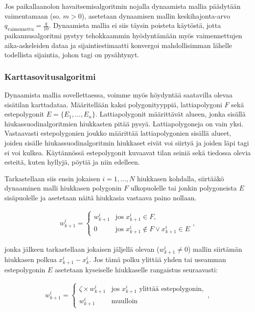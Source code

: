 \documentclass[
  12pt,
  a4paper, twoside]{book}
\begin{document}
Jos paikallaanolon havaitsemisalgoritmin nojalla dynaamista mallia päädytään vaimentamaan (so. \(m>0\)), asetetaan dynaamisen mallin keskihajonta-arvo \(q_{\text{vaimennettu}}=\frac{q}{10}\). Dynaamista mallia ei siis täysin poisteta käytöstä, jotta paikannusalgoritmi pystyy tehokkaammin hyödyntämään myös vaimennettujen aika-askeleiden dataa ja sijaintiestimaatti konvergoi mahdollisimman lähelle todellista sijaintia, johon tagi on pysähtynyt.

\hypertarget{karttasovitusalgoritmi}{%
\subsubsection{Karttasovitusalgoritmi}\label{karttasovitusalgoritmi}}

Dynaamista mallia sovellettaessa, voimme myös höydyntää saatavilla olevaa sisätilan karttadataa. Määritellään kaksi polygonityyppiä, lattiapolygoni \(F\) sekä estepolygonit \(E=\{E_1,\ldots,E_n\}\). Lattiapolygonit määrittävät alueen, jonka sisällä hiukassuodinalgoritmien hiukkasten pitää pysyä. Lattiapolygoneja on vain yksi. Vastaavasti estepolygonien joukko määrittää lattiapolygonien sisällä alueet, joiden sisälle hiukassuodinalgoritmin hiukkaset eivät voi siirtyä ja joiden läpi tagi ei voi kulkea. Käytännössä estepolygonit kuvaavat tilan seiniä sekä tiedossa olevia esteitä, kuten hyllyjä, pöytiä ja niin edelleen.

Tarkastellaan siis ensin jokaisen \(i=1,\ldots,N\) hiukkasen kohdalla, siirtääkö dynaaminen malli hiukkasen polygonin \(F\) ulkopuolelle tai jonkin polygoneista \(E\) sisäpuolelle ja asetetaan näitä hiukkasia vastaava paino nollaan.

\begin{align}\label{inclusion-polygon}
\displaystyle w^i_{k+1}={\begin{cases}w^i_{k+1}&\text{jos } x^i_{k+1} \in F,\\
0& \text{jos } x^i_{k+1} \notin F \lor x^i_{k+1} \in E \end{cases}},\end{align}

jonka jälkeen tarkastellaan jokaisen jäljellä olevan (\(w^i_{k+1} \neq 0\)) mallin siirtämän hiukkasen polkua \(x_{k+1}^i-x_{k}^i\). Jos tämä polku ylittää yhden tai useamman estepolygonin \(E\) asetetaan kyseiselle hiukkaselle rangaistus seuraavasti:

\begin{align}\label{exclusion-polygon}
\displaystyle w^i_{k+1}={\begin{cases}\zeta \times w^i_{k+1}&\text{jos } x^i_{k+1} \text{ ylittää estepolygonin},\\
w^i_{k+1}& \text{muulloin }\end{cases}},\end{align}
\end{document}
